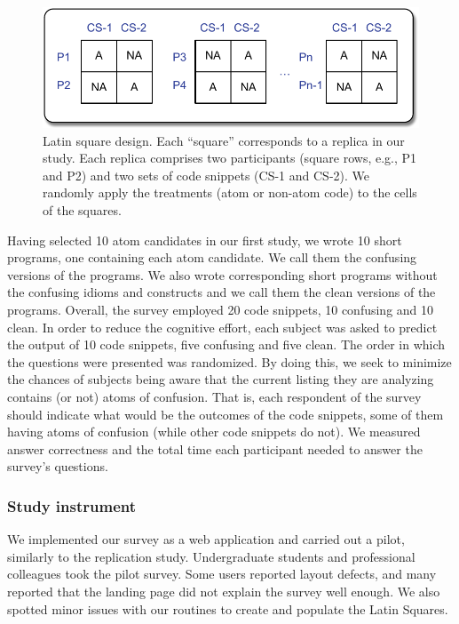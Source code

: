   \begin{figure}[htb!]
      \noindent
      \centering
      \includegraphics[scale=.50]{images/latin-square.pdf}
      \caption{Latin square design. Each ``square'' corresponds to 
      a replica in our study. Each replica comprises two participants (square rows, e.g., P1 and P2) 
      and two sets of code snippets (CS-1 and CS-2). We randomly apply the 
      treatments (atom or non-atom code) to the cells of the squares.} 
      \label{fig:latinsquare}
  \end{figure}


Having selected 10 atom candidates in our first study, we wrote 10 short programs, one containing each atom candidate. We call them the confusing versions of the programs. We also wrote corresponding short programs without the confusing idioms and constructs and we call them the clean versions of the programs. Overall, the survey employed 20 code snippets, 10 confusing and 10 clean. In order to reduce the cognitive effort, each subject was asked to predict the output of 10 code snippets, five confusing and five clean. The order in which the questions were presented was randomized. By doing this, we seek to minimize the chances of subjects being aware that the current listing they are analyzing contains (or not) atoms of confusion. That is, each respondent of the survey should indicate what would be the outcomes of the code snippets, some of them having atoms of confusion (while other code snippets do not).  We measured answer correctness and the total time each participant needed to answer the survey's questions.

\subsubsection*{Study instrument} 

We implemented our survey as a web application and carried out a pilot, similarly to the replication study. 
Undergraduate students and professional colleagues took the pilot survey. Some users reported layout defects, and many reported that the landing page did not explain the survey well enough. We also spotted minor issues with our routines to create and populate the Latin Squares. 

